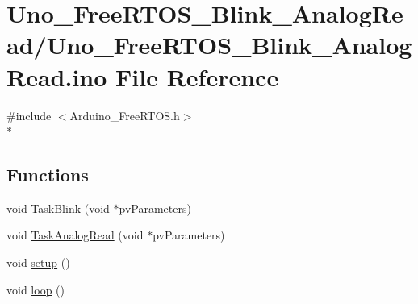 \hypertarget{Uno__FreeRTOS__Blink__AnalogRead_8ino}{\section{Uno\-\_\-\-Free\-R\-T\-O\-S\-\_\-\-Blink\-\_\-\-Analog\-Read/\-Uno\-\_\-\-Free\-R\-T\-O\-S\-\_\-\-Blink\-\_\-\-Analog\-Read.ino File Reference}
\label{Uno__FreeRTOS__Blink__AnalogRead_8ino}
}
{\ttfamily \#include $<$Arduino\-\_\-\-Free\-R\-T\-O\-S.\-h$>$}\\*
\subsection*{Functions}
\begin{DoxyCompactItemize}
\item 
void \hyperlink{Uno__FreeRTOS__Blink__AnalogRead_8ino_aac5118a046f2d7f65f4a0db3a4a20d22}{Task\-Blink} (void $\ast$pv\-Parameters)
\item 
void \hyperlink{Uno__FreeRTOS__Blink__AnalogRead_8ino_a06f0d69284e1cbc32d1cbe24b5a8b3b3}{Task\-Analog\-Read} (void $\ast$pv\-Parameters)
\item 
void \hyperlink{Uno__FreeRTOS__Blink__AnalogRead_8ino_a4fc01d736fe50cf5b977f755b675f11d}{setup} ()
\item 
void \hyperlink{Uno__FreeRTOS__Blink__AnalogRead_8ino_afe461d27b9c48d5921c00d521181f12f}{loop} ()
\end{DoxyCompactItemize}



